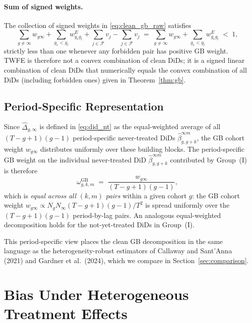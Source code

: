 \documentclass[12pt,letterpaper]{article}
\theoremstyle{remark}
\theoremstyle{definition}
\newcommand{\hbeta}{\hat{\beta}}
\newcommand{\hDelta}{\hat{\Delta}}
\begin{document}
\paragraph{Sum of signed weights.}
The collection of signed weights in \eqref{eq:clean_gb_raw} satisfies
\begin{equation}
  \sum_{g\neq\infty}w_{g\infty}
  +\sum_{g_e<g_l}w_{g_e g_l}^{E}
  +\sum_{j\in\mathcal{F}}v_j
  -\sum_{j\in\mathcal{F}}v_j
  \;=\;
  \sum_{g\neq\infty}w_{g\infty}
  +\sum_{g_e<g_l}w_{g_e g_l}^{E}
  \;<\;1,
  \label{eq:wgt_sum}
\end{equation}
strictly less than one whenever any forbidden pair has positive GB weight. TWFE
is therefore not a convex combination of clean DiDs; it is a signed linear
combination of clean DiDs that numerically equals the convex combination of all
DiDs (including forbidden ones) given in Theorem~\ref{thm:gb}.

\subsection{Period-Specific Representation}
\label{sec:period_specific}

Since $\hDelta_{g,\infty}$ is defined in \eqref{eq:did_nt} as the
equal-weighted average of all $(T-g+1)(g-1)$ period-specific never-treated
DiDs $\hbeta^{\infty m}_{g,g+k}$, the GB cohort weight $w_{g\infty}$
distributes uniformly over these building blocks. The period-specific GB weight
on the individual never-treated DiD $\hbeta^{\infty m}_{g,g+k}$ contributed
by Group~(I) is therefore
\begin{equation}
  \omega^{\mathrm{GB}}_{g,k,m}
  \;=\;
  \frac{w_{g\infty}}{(T-g+1)(g-1)},
  \label{eq:ps_weight}
\end{equation}
which is \emph{equal across all $(k,m)$ pairs} within a given cohort $g$:
the GB cohort weight $w_{g\infty}\propto N_gN_\infty(T-g+1)(g-1)/T^2$ is
spread uniformly over the $(T-g+1)(g-1)$ period-by-lag pairs. An analogous
equal-weighted decomposition holds for the not-yet-treated DiDs in Group~(I).

This period-specific view places the clean GB decomposition in the same
language as the heterogeneity-robust estimators of Callaway and Sant'Anna
(2021) and Gardner et al.\ (2024), which we compare in
Section~\ref{sec:comparison}.

\section{Bias Under Heterogeneous Treatment Effects}
\label{sec:hetero}
\end{document}
